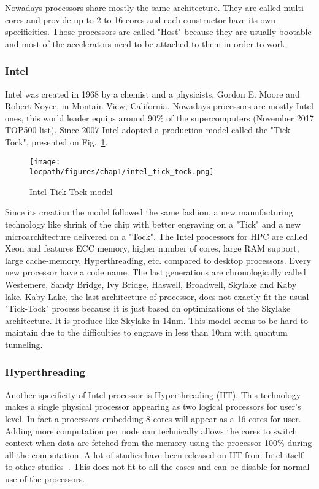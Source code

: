 Nowadays processors share mostly the same architecture. 
They are called multi-cores and provide up to 2 to 16 cores and each constructor have its own specificities. 
Those processors are called "Host" because they are usually bootable and most of the accelerators need to be attached to them in order to work.

\subsubsection{Intel}

Intel was created in 1968 by a chemist and a physicists, Gordon E. Moore and Robert Noyce, in Montain View, California. 
Nowadays processors are mostly Intel ones, this world leader equips around 90\% of the supercomputers (November 2017 TOP500 list).
Since 2007 Intel adopted a production model called the "Tick Tock", presented on Fig.~\ref{fig:1_HPC:intel_tick_tock}.

\begin{figure}
\begin{center}
\texttt{[image: \\locpath/figures/chap1/intel\_tick\_tock.png]}
\caption{Intel Tick-Tock model}
\label{fig:1_HPC:intel_tick_tock}
\end{center}
\end{figure}

Since its creation the model followed the same fashion, a new manufacturing technology like shrink of the chip with better engraving on a "Tick" and a new microarchitecture delivered on a "Tock".
The Intel processors for HPC are called Xeon and features ECC memory, higher number of cores, large RAM support, large cache-memory, Hyperthreading, etc. compared to desktop processors. 
Every new processor have a code name. 
The last generations are chronologically called Westemere, Sandy Bridge, Ivy Bridge, Haswell, Broadwell, Skylake and Kaby lake. 
Kaby Lake, the last architecture of processor, does not exactly fit the usual "Tick-Tock" process because it is just based on optimizations of the Skylake architecture. 
It is produce like Skylake in 14nm.
This model seems to be hard to maintain due to the difficulties to engrave in less than 10nm with quantum tunneling. 

\subsubsection{Hyperthreading}
Another specificity of Intel processor is Hyperthreading (HT). 
This technology makes a single physical processor appearing as two logical processors for user's level.
In fact a processors embedding 8 cores will appear as a 16 cores for user. 
Adding more computation per node can technically allows the cores to switch context when data are fetched from the memory using the processor 100\% during all the computation. 
A lot of studies have been released on HT from Intel itself~\cite{marr2002hyperthreading} to other studies~\cite{bononi2006exploring,leng2002empirical}.
This does not fit to all the cases and can be disable for normal use of the processors. 

